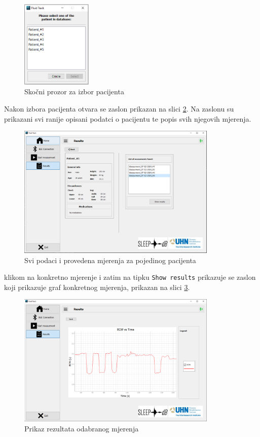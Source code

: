 \documentclass[../diplomski_rad.tex]{subfiles}
\begin{document}
\begin{figure}[htb]
    \centering
    \includegraphics[width=0.3\textwidth]{Figures/select_patient.png} 
    \caption{Skočni prozor za izbor pacijenta}
    \label{slk:select_patient}
\end{figure} 

Nakon izbora pacijenta otvara se zaslon prikazan na slici \ref{slk:results_p}. 
Na zaslonu su prikazani svi ranije opisani podatci o pacijentu te popis svih njegovih mjerenja.

\begin{figure}[htb]
    \centering
    \includegraphics[width=0.85\textwidth]{Figures/results_p.png} 
    \caption{Svi podaci i provedena mjerenja za pojedinog pacijenta}
    \label{slk:results_p}
\end{figure}

klikom na konkretno mjerenje i zatim na tipku \texttt{Show results} prikazuje se zaslon koji prikazuje 
graf konkretnog mjerenja, prikazan na slici \ref{slk:results_g}. 

\begin{figure}[htb]
    \centering
    \includegraphics[width=0.85\textwidth]{Figures/results_g.png} 
    \caption{Prikaz rezultata odabranog mjerenja}
    \label{slk:results_g}
\end{figure}
\end{document}
